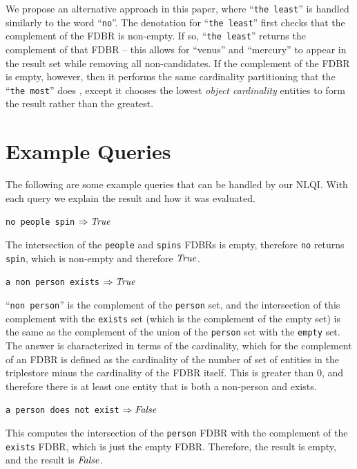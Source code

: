 \documentclass[../main.tex]{subfiles}
\begin{document}
\begin{refsection}
We propose an alternative approach in this paper, where ``\texttt{the least}'' is handled similarly to the word ``\texttt{no}''.  The denotation for ``\texttt{the least}'' first checks that the complement of the FDBR is non-empty.  If so, ``\texttt{the least}'' returns the complement of that FDBR -- this allows for ``venus'' and ``mercury'' to appear in the result set while removing all non-candidates.  If the complement of the FDBR is empty, however, then it performs the same cardinality partitioning that the ``\texttt{the most}'' does \cite{frostpeelar2019}, except it chooses the lowest {\em object cardinality} entities to form the result rather than the greatest.

\section{Example Queries}
\label{sec:examples}
\noindent The following are some example queries that can be handled by our NLQI.  With each query
we explain the result and how it was evaluated.

\examplespacing

\texttt{no people spin} $\Rightarrow \mathit{True}$

\examplespacing

\noindent The intersection of the \texttt{people} and \texttt{spins} FDBRs is empty, therefore \texttt{no} returns \texttt{spin}, which is non-empty and therefore $\mathit{True}$.

\texttt{a non person exists} $\Rightarrow \mathit{True}$

\examplespacing

\noindent ``\texttt{non person}'' is the complement of the \texttt{person} set, and the intersection of this complement with the \texttt{exists} set (which is the complement of the empty set) is the same as the complement of the union of the \texttt{person} set with the \texttt{empty} set.  The answer is characterized in terms of the cardinality, which for the complement of an FDBR is defined as the cardinality of the number of set of entities in the triplestore minus the cardinality of the FDBR itself.  This is greater than 0, and therefore there is at least one entity that is both a non-person and exists.

\examplespacing

\texttt{a person does not exist} $\Rightarrow \mathit{False}$

\examplespacing

\noindent This computes the intersection of the \texttt{person} FDBR with the complement of the \texttt{exists} FDBR, which is just the empty FDBR.  Therefore, the result is empty, and the result is $\mathit{False}$.


\end{refsection}
\end{document}

